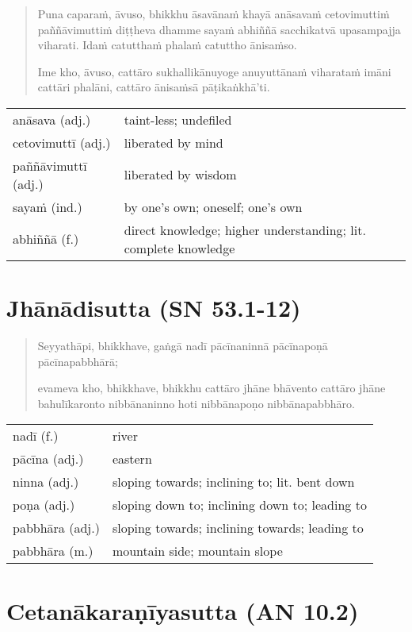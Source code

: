\documentclass[11pt,oneside]{memoir}
\begin{document}
\begin{quote}
Puna caparaṁ, āvuso, bhikkhu āsavānaṁ khayā anāsavaṁ cetovimuttiṁ paññāvimuttiṁ
diṭṭheva dhamme sayaṁ abhiññā sacchikatvā upasampajja viharati. Idaṁ catutthaṁ
phalaṁ catuttho ānisaṁso.

Ime kho, āvuso, cattāro sukhallikānuyoge anuyuttānaṁ viharataṁ imāni cattāri
phalāni, cattāro ānisaṁsā pāṭikaṅkhā’ti.
\end{quote}

\begin{longtable}{L{\colOne} L{\colTwo}}
anāsava (adj.) & taint-less; undefiled\\[0pt]
cetovimuttī (adj.) & liberated by mind\\[0pt]
paññāvimuttī (adj.) & liberated by wisdom\\[0pt]
sayaṁ (ind.) & by one’s own; oneself; one’s own\\[0pt]
abhiññā (f.) & direct knowledge; higher understanding; lit. complete knowledge\\[0pt]
\end{longtable}

\section{Jhānādisutta (SN 53.1-12)}
\label{sec:orgac4b7b9}

\begin{quote}
Seyyathāpi, bhikkhave, gaṅgā nadī pācīnaninnā pācīnapoṇā pācīnapabbhārā;

evameva kho, bhikkhave, bhikkhu cattāro jhāne bhāvento cattāro jhāne
bahulīkaronto nibbānaninno hoti nibbānapoṇo nibbānapabbhāro.
\end{quote}

\begin{longtable}{L{\colOne} L{\colTwo}}
nadī (f.) & river\\[0pt]
pācīna (adj.) & eastern\\[0pt]
ninna (adj.) & sloping towards; inclining to; lit. bent down\\[0pt]
poṇa (adj.) & sloping down to; inclining down to; leading to\\[0pt]
pabbhāra (adj.) & sloping towards; inclining towards; leading to\\[0pt]
pabbhāra (m.) & mountain side; mountain slope\\[0pt]
\end{longtable}

\clearpage

\section{Cetanākaraṇīyasutta (AN 10.2)}
\label{sec:org7c6e09f}
\end{document}

